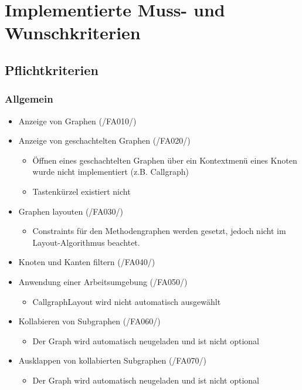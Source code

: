 \chapter{Implementierte Muss- und Wunschkriterien}
\label{ch:implkrit}

\section{Pflichtkriterien}

\subsection{Allgemein}
\begin{itemize}
	\item Anzeige von Graphen (/FA010/)
	\item Anzeige von geschachtelten Graphen (/FA020/)
		\begin{itemize}
			\item Öffnen eines geschachtelten Graphen über ein Kontextmenü eines Knoten wurde nicht implementiert (z.B. Callgraph)
			\item Tastenkürzel existiert nicht
		\end{itemize}
	\item Graphen layouten (/FA030/)
		\begin{itemize}
			\item Constraints für den Methodengraphen werden gesetzt, jedoch nicht im Layout-Algorithmus beachtet.
		\end{itemize}
	\item Knoten und Kanten filtern (/FA040/)
	\item Anwendung einer Arbeitsumgebung (/FA050/)
		\begin{itemize}
			\item CallgraphLayout wird nicht automatisch ausgewählt
		\end{itemize}
	\item Kollabieren von Subgraphen (/FA060/)
		\begin{itemize}
			\item Der Graph wird automatisch neugeladen und ist nicht optional
		\end{itemize}
	\item Ausklappen von kollabierten Subgraphen (/FA070/)
		\begin{itemize}
			\item Der Graph wird automatisch neugeladen und ist nicht optional
		\end{itemize}
\end{itemize}

